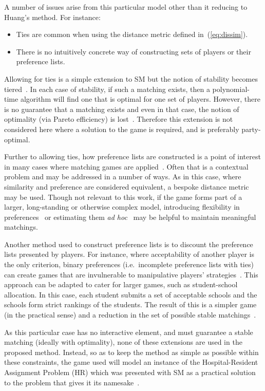 A number of issues arise from this particular model other than it reducing to
Huang's method. For instance:
\begin{itemize}
    \item Ties are common when using the distance metric defined
        in~(\ref{eq:dissim}).
    \item There is no intuitively concrete way of constructing sets of players
        or their preference lists.
\end{itemize}

Allowing for ties is a simple extension to SM but the notion of stability
becomes tiered~\cite{Manlove1999}. In each case of stability, if such a matching
exists, then a polynomial-time algorithm will find one that is optimal for one
set of players. However, there is no guarantee that a matching exists and even
in that case, the notion of optimality (via Pareto efficiency) is
lost~\cite{Erdil2017}. Therefore this extension is not considered here where a
solution to the game is required, and is preferably party-optimal.

Further to allowing ties, how preference lists are constructed is a point of
interest in many cases where matching games are applied~\cite{Iwama2008}. Often
that is a contextual problem and may be addressed in a number of ways. As in
this case, where similarity and preference are considered equivalent, a bespoke
distance metric may be used. Though not relevant to this work, if the game forms
part of a larger, long-standing or otherwise complex model, introducing
flexibility in preferences~\cite{Agarwal2017,Menzel2015} or estimating them
\emph{ad hoc}~\cite{Rastegari2016} may be helpful to maintain meaningful
matchings.

Another method used to construct preference lists is to discount the preference
lists presented by players. For instance, where acceptability of another player
is the only criterion, binary preferences (i.e.\ incomplete preference lists
with ties) can create games that are invulnerable to manipulative players'
strategies~\cite{Bogomolnaia2004}. This approach can be adapted to cater for
larger games, such as student-school allocation. In this case, each student
submits a set of acceptable schools and the schools form strict rankings of the
students. The result of this is a simpler game (in the practical sense) and a
reduction in the set of possible stable matchings~\cite{Haeringer2014}.

As this particular case has no interactive element, and must guarantee a stable
matching (ideally with optimality), none of these extensions are used in the
proposed method. Instead, so as to keep the method as simple as possible within
these constraints, the game used will model an instance of the Hospital-Resident
Assignment Problem (HR) which was presented with SM as a practical solution to
the problem that gives it its namesake~\cite{Gale1962}.

